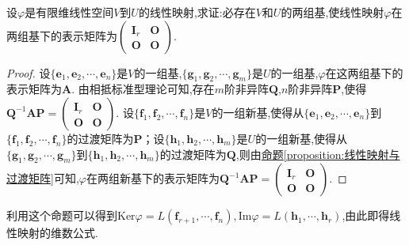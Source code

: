 \documentclass[../../main.tex]{subfiles}%
\begin{document}
\begin{proposition}\label{proposition:线性映射在基下的矩阵为标准型}
设\(\varphi\)是有限维线性空间\(V\)到\(U\)的线性映射,求证:必存在\(V\)和\(U\)的两组基,使线性映射\(\varphi\)在两组基下的表示矩阵为\(\begin{pmatrix}\boldsymbol{I}_r&\boldsymbol{O}\\\boldsymbol{O}&\boldsymbol{O}\end{pmatrix}\).
\end{proposition}
\begin{proof}
设\(\{\boldsymbol{e}_1,\boldsymbol{e}_2,\cdots,\boldsymbol{e}_n\}\)是\(V\)的一组基,\(\{\boldsymbol{g}_1,\boldsymbol{g}_2,\cdots,\boldsymbol{g}_m\}\)是\(U\)的一组基,\(\varphi\)在这两组基下的表示矩阵为\(\boldsymbol{A}\). 由相抵标准型理论可知,存在\(m\)阶非异阵\(\boldsymbol{Q}\),\(n\)阶非异阵\(\boldsymbol{P}\),使得\(\boldsymbol{Q}^{-1}\boldsymbol{A}\boldsymbol{P}=\begin{pmatrix}\boldsymbol{I}_r&\boldsymbol{O}\\\boldsymbol{O}&\boldsymbol{O}\end{pmatrix}\). 设\(\{\boldsymbol{f}_1,\boldsymbol{f}_2,\cdots,\boldsymbol{f}_n\}\)是\(V\)的一组新基,使得从\(\{\boldsymbol{e}_1,\boldsymbol{e}_2,\cdots,\boldsymbol{e}_n\}\)到\(\{\boldsymbol{f}_1,\boldsymbol{f}_2,\cdots,\boldsymbol{f}_n\}\)的过渡矩阵为\(\boldsymbol{P}\)；设\(\{\boldsymbol{h}_1,\boldsymbol{h}_2,\cdots,\boldsymbol{h}_m\}\)是\(U\)的一组新基,使得从\(\{\boldsymbol{g}_1,\boldsymbol{g}_2,\cdots,\boldsymbol{g}_m\}\)到\(\{\boldsymbol{h}_1,\boldsymbol{h}_2,\cdots,\boldsymbol{h}_m\}\)的过渡矩阵为\(\boldsymbol{Q}\),则由\hyperref[proposition:线性映射与过渡矩阵]{命题\ref{proposition:线性映射与过渡矩阵}}可知,\(\varphi\)在两组新基下的表示矩阵为\(\boldsymbol{Q}^{-1}\boldsymbol{A}\boldsymbol{P}=\begin{pmatrix}\boldsymbol{I}_r&\boldsymbol{O}\\\boldsymbol{O}&\boldsymbol{O}\end{pmatrix}\). 
\end{proof}
\begin{remark}
利用这个命题可以得到\(\text{Ker}\varphi = L(\boldsymbol{f}_{r + 1},\cdots,\boldsymbol{f}_n),\text{Im}\varphi = L(\boldsymbol{h}_1,\cdots,\boldsymbol{h}_r)\),由此即得线性映射的维数公式.
\end{remark}
\end{document}

